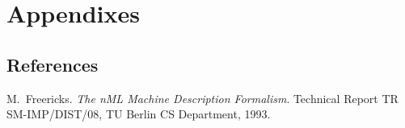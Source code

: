 \documentclass[oneside,final,14pt]{extreport}
\begin{document}

\chapter{Appendixes}

\section{References}



\begin{thebibliography}{1}

M.~Freericks.
\emph{The nML Machine Description Formalism}.
Technical Report TR SM-IMP/DIST/08, TU Berlin CS Department, 1993.

\end{thebibliography}
\end{document}
